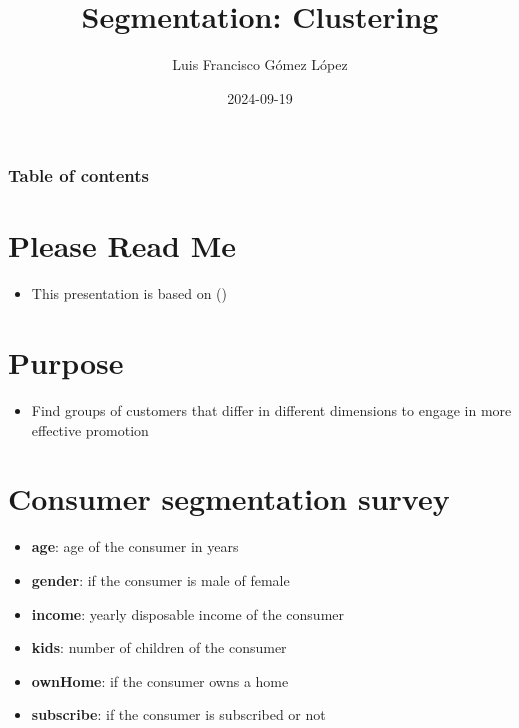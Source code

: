 \documentclass[
  ignorenonframetext,
]{beamer}
\title{Segmentation: Clustering}
\author{Luis Francisco Gómez López}
\date{2024-09-19}
\institute{FAEDIS}
\providecommand{\tightlist}{%
  \setlength{\itemsep}{0pt}\setlength{\parskip}{0pt}}\usepackage{longtable,booktabs,array}
\renewcommand*\contentsname{Table of contents}
\newcommand\contentsname{Table of contents}
\begin{document}
\frame{\titlepage}

\renewcommand*\contentsname{Table of contents}
\begin{frame}[allowframebreaks]
  \frametitle{Table of contents}
  \tableofcontents[hideallsubsections]
\end{frame}

\section{Please Read Me}\label{please-read-me}

\begin{frame}{}
\label{section}
\begin{itemize}
\tightlist
\item
  This presentation is based on ()
\end{itemize}
\end{frame}

\section{Purpose}\label{purpose}

\begin{frame}{}
\label{section-1}
\begin{itemize}
\tightlist
\item
  Find groups of customers that differ in different dimensions to engage
  in more effective promotion
\end{itemize}
\end{frame}

\section{Consumer segmentation
survey}\label{consumer-segmentation-survey}

\begin{frame}{}
\label{section-2}
\begin{itemize}
\tightlist
\item
  \textbf{age}: age of the consumer in years
\item
  \textbf{gender}: if the consumer is male of female
\item
  \textbf{income}: yearly disposable income of the consumer
\item
  \textbf{kids}: number of children of the consumer
\item
  \textbf{ownHome}: if the consumer owns a home
\item
  \textbf{subscribe}: if the consumer is subscribed or not
\end{itemize}
\end{frame}
\end{document}
